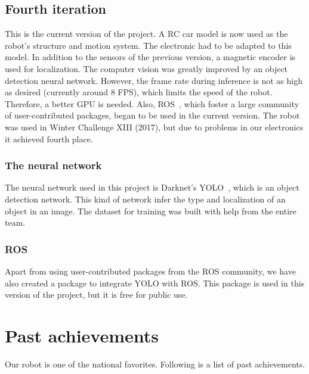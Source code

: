 \documentclass[conference]{IEEEtran}
\begin{document}


\subsection{Fourth iteration}
This is the current version of the project. A RC car model is now used as the robot's
structure and motion system. The electronic had to be adapted to this model.
In addition to the sensors of the previous version, a magnetic encoder is used for
localization. The computer vision was greatly improved by an object detection neural network.
However, the frame rate during inference is not as high as desired (currently around 8 FPS),
which limits the speed of the robot. Therefore, a better GPU is needed. Also, ROS~\cite{ROS},
which foster a large community of user-contributed packages, began to be used in the current
version.
The robot was used in Winter Challenge XIII (2017), but due to problems in our electronics
it achieved fourth place.
\setcounter{subsubsection}{0}
\subsubsection{The neural network}
The neural network used in this project is Darknet's YOLO~\cite{YOLO}, which is an object
detection network. This kind of network infer the type and localization of an object in an
image. The dataset for training was built with help from the entire team.
\subsubsection{ROS}
Apart from using user-contributed packages from the ROS community, we have also created a
package to integrate YOLO with ROS. This package is used in this version of the project,
but it is free for public use.
\section{Past achievements} \label{past-achievements}
Our robot is one of the national favorites. Following is a list of past achievements.

\end{document}
